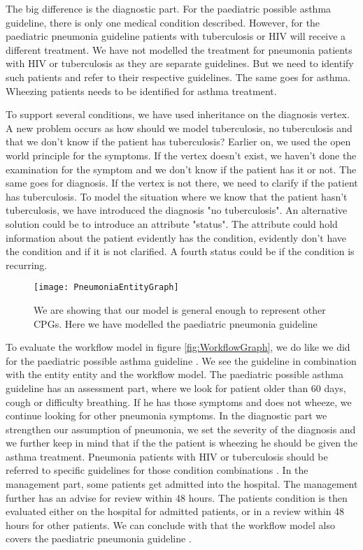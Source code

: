 \documentclass[a4paper,12pt]{book}
\begin{document}
The big difference is the diagnostic part. For the paediatric possible asthma guideline, there is only one medical condition described. However, for the paediatric pneumonia guideline patients with tuberculosis or HIV will receive a different treatment. We have not modelled the treatment for pneumonia patients with HIV or tuberculosis as they are separate guidelines. But we need to identify such patients and refer to their respective guidelines. The same goes for asthma. Wheezing patients needs to be identified for asthma treatment.

To support several conditions, we have used inheritance on the diagnosis vertex. A new problem occurs as how should we model tuberculosis, no tuberculosis and that we don't know if the patient has tuberculosis? Earlier on, we used the open world principle for the symptoms. If the vertex doesn't exist, we haven't done the examination for the symptom and we don't know if the patient has it or not. The same goes for diagnosis. If the vertex is not there, we need to clarify if the patient has tuberculosis. To model the situation where we know that the patient hasn't tuberculosis, we have introduced the diagnosis "no tuberculosis". An alternative solution could be to introduce an attribute "status". The attribute could hold information about the patient evidently has the condition, evidently don't have the condition and if it is not clarified. A fourth status could be if the condition is recurring.

\begin{figure}[h!]
	\caption {We are showing that our model is general enough to represent other CPGs. Here we have modelled the paediatric pneumonia guideline \parencite{RepublicofKeny2016}}
	\label{fig:PneumoniaEntityGraph}
	\texttt{[image: PneumoniaEntityGraph]}
\end{figure}

To evaluate the workflow model in figure \ref{fig:WorkflowGraph}, we do like we did for the paediatric possible asthma guideline \parencite{RepublicofKeny2016}. We see the guideline in combination with the entity entity and the workflow model. The paediatric possible asthma guideline \parencite{RepublicofKeny2016} has an assessment part, where we look for patient older than 60 days, cough or difficulty breathing. If he has those symptoms and does not wheeze, we continue looking for other pneumonia symptoms. In the diagnostic part we strengthen our assumption of pneumonia, we set the severity of the diagnosis and we further keep in mind that if the the patient is wheezing he should be given the asthma treatment. Pneumonia patients with HIV or tuberculosis should be referred to specific guidelines for those condition combinations \parencite{RepublicofKeny2016}. In the management part, some patients get admitted into the hospital. The management further has an advise for review within 48 hours. The patients condition is then evaluated either on the hospital for admitted patients, or in a review within 48 hours for other patients. We can conclude with that the workflow model  also covers the paediatric pneumonia guideline \parencite{RepublicofKeny2016}.
\end{document}
